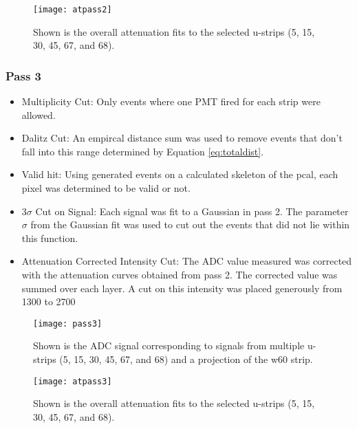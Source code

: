 \begin{figure}[h]
    \centering
    \texttt{[image: atpass2]}
    \caption{Shown is the overall attenuation fits to the selected u-strips 
    (5, 15, 30, 45, 67, and 68).}
    \label{fig:atpass2}
\end{figure}



\clearpage
\FloatBarrier
\subsubsection{Pass 3}
\begin{itemize}
    \item Multiplicity Cut: Only events where one PMT fired for each strip were allowed.
    \item Dalitz Cut: An empircal distance sum was used to remove events that don't fall 
    into this range determined by Equation \ref{eq:totaldist}.
    \item Valid hit: Using generated events on a calculated skeleton of the pcal, each 
    pixel was determined to be valid or not.
    \item 3$\sigma$ Cut on Signal: Each signal was fit to a Gaussian in pass 2. The parameter 
    $\sigma$ from the Gaussian fit was used to cut out the events that did not lie within this function.
    \item Attenuation Corrected Intensity Cut: The ADC value measured was corrected with the 
    attenuation curves obtained from pass 2. The corrected value was summed over each layer. 
    A cut on this intensity was placed generously from 1300 to 2700
\end{itemize}

\begin{figure}[h]
    \centering
    \texttt{[image: pass3]}
    \caption{Shown is the ADC signal corresponding to signals from multiple u-strips 
    (5, 15, 30, 45, 67, and 68) and a projection of the w60 strip.}
    \label{fig:pass3}
\end{figure}

\begin{figure}[h]
    \centering
    \texttt{[image: atpass3]}
    \caption{Shown is the overall attenuation fits to the selected u-strips 
    (5, 15, 30, 45, 67, and 68).}
    \label{fig:atpass3}
\end{figure}

\clearpage
\FloatBarrier
